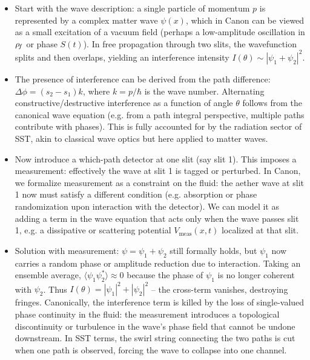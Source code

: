 \documentclass[11pt]{article}
\begin{document}
\begin{itemize}

\item 
Start with the wave description: a single particle of momentum $p$ is represented by a complex matter wave $\psi(x)$, which in Canon can be viewed as a small excitation of a vacuum field (perhaps a low-amplitude oscillation in $\rho_{\!f}$ or phase $S(t)$). In free propagation through two slits, the wavefunction splits and then overlaps, yielding an interference intensity $I(\theta) \sim |\psi_1 + \psi_2|^2$.




\item 
The presence of interference can be derived from the path difference: $\Delta \phi = (s_2 - s_1) k$, where $k=p/\hbar$ is the wave number. Alternating constructive/destructive interference as a function of angle $\theta$ follows from the canonical wave equation (e.g. from a path integral perspective, multiple paths contribute with phases). This is fully accounted for by the radiation sector of SST, akin to classical wave optics but here applied to matter waves.




\item 
Now introduce a which-path detector at one slit (say slit 1). This imposes a measurement: effectively the wave at slit 1 is tagged or perturbed. In Canon, we formalize measurement as a constraint on the fluid: the aether wave at slit 1 now must satisfy a different condition (e.g. absorption or phase randomization upon interaction with the detector). We can model it as adding a term in the wave equation that acts only when the wave passes slit 1, e.g. a dissipative or scattering potential $V_{\text{meas}}(x,t)$ localized at that slit.




\item 
Solution with measurement: $\psi = \psi_1 + \psi_2$ still formally holds, but $\psi_1$ now carries a random phase or amplitude reduction due to interaction. Taking an ensemble average, $\langle \psi_1 \psi_2^* \rangle \approx 0$ because the phase of $\psi_1$ is no longer coherent with $\psi_2$. Thus $I(\theta) = |\psi_1|^2 + |\psi_2|^2$ – the cross-term vanishes, destroying fringes. Canonically, the interference term is killed by the loss of single-valued phase continuity in the fluid: the measurement introduces a topological discontinuity or turbulence in the wave’s phase field that cannot be undone downstream. In SST terms, the swirl string connecting the two paths is cut when one path is observed, forcing the wave to collapse into one channel.





\end{itemize}
\end{document}
